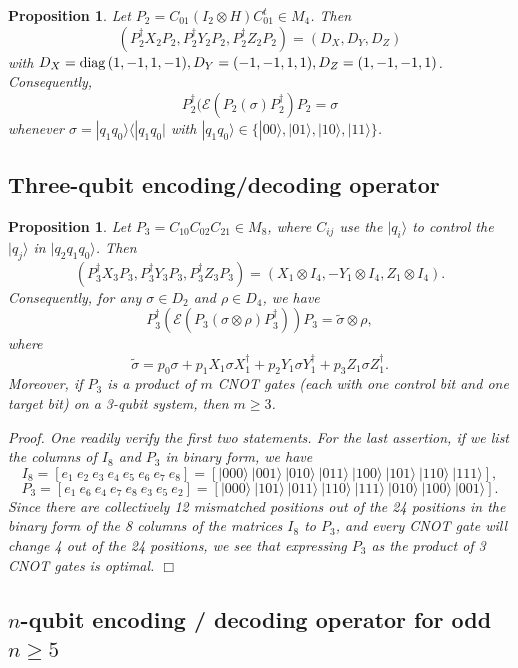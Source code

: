 \documentclass[11pt]{article}
\newtheorem{proposition}[theorem]{Proposition}
\def\qed{\hfill $\Box$\medskip}
\def\cE{{\mathcal E}}
\def\ra{{\rangle}}
\def\la{{\langle}}
\def\diag{{\rm diag}\,}
\def\ket#1{| #1 \rangle}
\begin{document}
\begin{proposition} \label{2.1}
Let $P_2 = C_{01} (I_2\otimes H)C_{01}^t\in M_4$.
Then 
\begin{equation}\label{eq1}
(P_2^\dag X_2P_2, P_2^\dag Y_2P_2, P_2^\dag Z_2P_2) =
(D_X, D_Y, D_Z)
\end{equation}
 with 
$D_X = \diag(1,-1,1,-1), D_Y=(-1,-1,1,1), D_Z = (1, -1, -1, 1)$.
Consequently, 
$$P_2^\dag(\cE(P_2(\sigma)P_2^\dag)P_2 = \sigma$$
whenever  $\sigma = |q_1q_0\ra \la |q_1q_0|$  with 
$|q_1q_0\ra \in \{|00\ra, |01\ra, |10\ra, |11\ra\}$. 
\end{proposition}

\subsection{Three-qubit encoding/decoding operator} 

\begin{proposition}\label{2.2}
Let $P_3 =  C_{10} C_{02} C_{21} \in M_8$, where
$C_{ij}$ use the $|q_i\ra$ to control the $|q_j\ra$
in $|q_2q_1q_0\ra$. 
Then 
 $$(P_3^\dag X_3P_3, P_3^\dag Y_3P_3, P_3^\dag Z_3P_3) = 
 (X_1 \otimes I_4, -Y_1 \otimes I_4, Z_1 \otimes I_4).$$
Consequently, for any $\sigma \in D_2$ and $\rho \in D_{4}$, we have
$$P_3^\dag(\cE(P_3(\sigma\otimes \rho)P_3^\dag))P_3 = \tilde \sigma \otimes \rho,$$
where
$$\tilde \sigma 
= p_0 \sigma + p_1 X_1\sigma X_1^\dag + p_2 Y_1\sigma Y_1^\dag
+ p_3 Z_1 \sigma Z_1^\dag.$$ 
Moreover, if $P_3$ is a product of $m$ CNOT gates 
(each with one control bit and one
target bit) on a 3-qubit system, then $m \ge 3$.
\end{proposition}

\it Proof. \rm One readily verify the first two statements. 
For the last assertion, 
if we list the columns of $I_8$ and $P_3$ in binary form, we have
$$ I_8 = [e_1 \ e_2 \ e_3 \ e_4 \ e_5 \ e_6 \ e_7 \ e_8] = [
 \ket{000}\    \ket{001}\    \ket{010}\    \ket{011}\    
 \ket{100}\     \ket{101}\    \ket{110}\    \ket{111}],$$
 $$P_3 = [e_1 \ e_6 \ e_4 \ e_7 \ e_8 \ e_3 \ e_5 \ e_2] = [
\ket{000}\    \ket{101}\    \ket{011}\   \ket{110}\    
\ket{111}\    \ket{010}\    \ket{100}\    \ket{001}]. 
$$
Since there are collectively 12 mismatched positions out of the 24 
positions
in the binary form of the 8 columns of the matrices $I_8$ to $P_3$,
and every CNOT gate will change 4 out of the 
24 positions, we see that expressing $P_3$ as the product of 
3 CNOT gates is optimal. \qed

\subsection{$n$-qubit encoding / decoding operator for odd $n \ge 5$}
 
\end{document}
